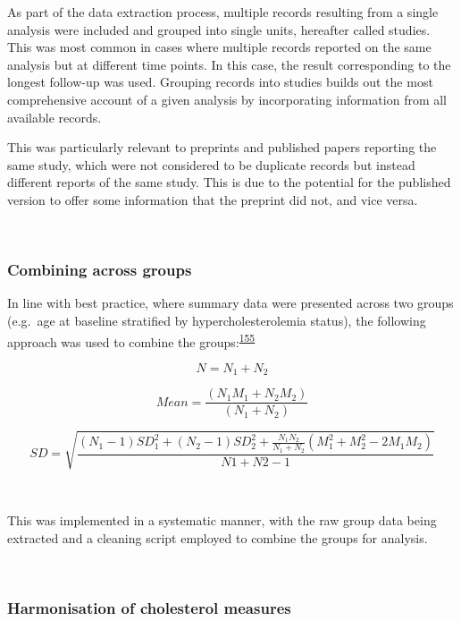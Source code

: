 \documentclass[a4paper, twoside]{templates/ociamthesis}
\begin{document}
As part of the data extraction process, multiple records resulting from a single analysis were included and grouped into single units, hereafter called studies. This was most common in cases where multiple records reported on the same analysis but at different time points. In this case, the result corresponding to the longest follow-up was used. Grouping records into studies builds out the most comprehensive account of a given analysis by incorporating information from all available records.

This was particularly relevant to preprints and published papers reporting the same study, which were not considered to be duplicate records but instead different reports of the same study. This is due to the potential for the published version to offer some information that the preprint did not, and vice versa.

~

\hypertarget{combining-across-groups}{%
\subsubsection{Combining across groups}\label{combining-across-groups}}

In line with best practice, where summary data were presented across two groups (e.g.~age at baseline stratified by hypercholesterolemia status), the following approach was used to combine the groups:\textsuperscript{\protect\hyperlink{ref-higgins2019}{155}}

\begin{equation}
N = N_1 + N_2
  \label{eq:combiningGroups1}
\end{equation}

\begin{equation}
Mean = \frac{(N_1M_1 + N_2M_2)}{(N_1 + N_2)}
  \label{eq:combiningGroups2}
\end{equation}

\begin{equation}
SD = \sqrt{\frac{(N_1-1)SD_1^2 + (N_2-1)SD_2^2 + \frac{N_1N_2}{N_1 + N_2}(M_1^2 + M_2^2 - 2M_1M_2)}{N1 + N2 -1}}
  \label{eq:combiningGroups3}
\end{equation}

~

This was implemented in a systematic manner, with the raw group data being extracted and a cleaning script employed to combine the groups for analysis.

~

\hypertarget{harmonisation-of-cholesterol-measures}{%
\subsubsection{Harmonisation of cholesterol measures}\label{harmonisation-of-cholesterol-measures}}
\end{document}
